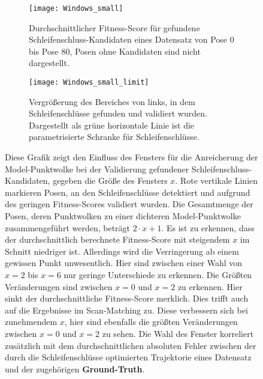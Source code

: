 \begin{figure}
	\centering
	\begin{subfigure}{.5\textwidth}
		 \centering
  		 \texttt{[image: Windows\_small]}
  		 \centering \caption{Durchschnittlicher Fitness-Score für gefundene Schleifenschluss-Kandidaten eines Datensatz von Pose $0$ bis Pose $80$, Posen ohne Kandidaten sind nicht dargestellt.}
  		 \label{fig:single_tsdf}
	\end{subfigure}%
	\begin{subfigure}{.5\textwidth}
    	\centering
  		\texttt{[image: Windows\_small\_limit]}
  		\centering \caption{Vergrößerung des Bereiches von links, in dem Schleifenschlüsse gefunden und validiert wurden. Dargestellt als grüne horizontale Linie ist die parametrisierte Schranke für Schleifenschlüsse.}
  		\label{fig:approx_cloud}
	\end{subfigure}
	\caption{Diese Grafik zeigt den Einfluss des Fensters für die Anreicherung der Model-Punktwolke bei der Validierung gefundener Schleifenschluss-Kandidaten, gegeben die Größe des Fensters $x$. Rote vertikale Linien markieren Posen, an den Schleifenschlüsse detektiert und aufgrund des geringen Fitness-Scores validiert wurden. Die Gesamtmenge der Posen, deren Punktwolken zu einer dichteren Model-Punktwolke zusammengeführt werden, beträgt $2 \cdot x + 1$. Es ist zu erkennen, dass der durchschnittlich berechnete Fitness-Score mit steigendem $x$ im Schnitt niedriger ist. Allerdings wird die Verringerung ab einem gewissen Punkt unwesentlich. Hier sind zwischen einer Wahl von $x = 2$ bis $x = 6$ nur geringe Unterschiede zu erkennen. Die Größten Veränderungen sind zwischen $x = 0$ und $x = 2$ zu erkennen. Hier sinkt der durchschnittliche Fitness-Score merklich. Dies trifft auch auf die Ergebnisse im Scan-Matching zu. Diese verbessern sich bei zunehmendem $x$, hier sind ebenfalls die größten Veränderungen zwischen $x=0$ und $x=2$ zu sehen. Die Wahl des Fenster korreliert zusätzlich mit dem durchschnittlichen absoluten Fehler zwischen der durch die Schleifenschlüsse optimierten Trajektorie eines Datensatz und der zugehörigen \textbf{Ground-Truth}.}
	\label{fig:Windows}
\end{figure}

